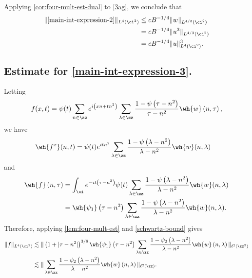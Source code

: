Applying \cref{cor:four-mult-est-dual} to \eqref{3ag}, we conclude that 
%
%
\begin{equation}
	\label{main-int-est-2}
	\begin{split}
		\|\eqref{main-int-expression-2}\|_{L^4(\ci^2)} 
		& \le c B^{-1/4} \|w\|_{L^{4/3}(\ci^2)}
		\\
		& = c B^{-1/4} \|u^3\|_{L^{4/3}(\ci^2)}
		\\
		& = c B^{-1/4} \|u\|^3_{L^4(\ci^2)}.
	\end{split}
\end{equation}

\subsection{Estimate for \eqref{main-int-expression-3}.} 
Letting $$f(x,t) = \psi(t) \sum_{n \in \zz} e^{i\left( xn + tn^2 \right)} 
\sum_{\lambda \in \zz} \frac{1 - \psi\left( \tau - n^2 \right)}{\tau - n^2} 
\wh{w} \left( n, \tau \right),$$ we have
%
%
\begin{equation*}
	\begin{split}
		& \wh{f^x}(n, t) = \psi(t) e^{itn^2} \sum_{\lambda \in \zz} 
		\frac{1 - \psi\left( \lambda - n^2 \right)}{\lambda - n^2} 
		\wh{w}(n, \lambda)
	\end{split}
\end{equation*}
and
\begin{equation*}
	\begin{split}
		 \wh{f}\left( n, \tau \right)
		 & = \int_\ci e^{-it\left( \tau - n^2 
		\right)} \psi(t) \sum_{\lambda \in \zz} \frac{1 - \psi\left( 
		\lambda - n^2 
		\right)}{\lambda - n^2} \wh{w}(n, \lambda)
		\\
		& = \wh{\psi_1}\left( \tau - n^2 \right) \sum_{\lambda \in \zz}
		\frac{1 - \psi\left( 
		\lambda - n^2 
		\right)}{\lambda - n^2} \wh{w}(n, \lambda).
	\end{split}
\end{equation*}
%
%
Therefore, applying \cref{lem:four-mult-est} and 
\eqref{schwartz-bound} gives 
%
%
\begin{equation}
	\label{4hh}
	\begin{split}
		\|f\|_{L^4(\ci^2)}
		& \lesssim \|\left( 1 + | \tau - n^2| \right)^{3/8} 
		\wh{\psi_1}\left( \tau - n^2 \right) \sum_{\lambda \in \zz} 
		\frac{1 - \psi_2\left( \lambda - n^2 \right)}{\lambda - n^2} 
		\wh{w}\left( n, \lambda \right) 
		\|_{\ell^2\left( \zz^2 \right)}
		\\
		& \lesssim \|\sum_{\lambda \in \zz}
		\frac{1 - \psi_2\left( \lambda - n^2 \right)}{\lambda - n^2} \wh{w} 
		\left( n, \lambda \right) \|_{\ell^2\left( \zz \right)}.
	\end{split}
\end{equation}

